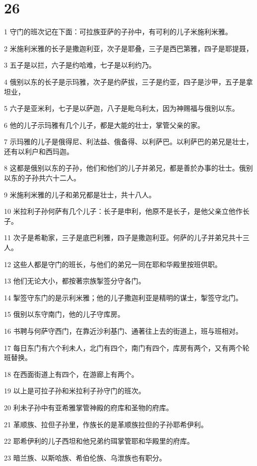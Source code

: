 \chapter{26}

\par 1 守门的班次记在下面：可拉族亚萨的子孙中，有可利的儿子米施利米雅。
\par 2 米施利米雅的长子是撒迦利亚，次子是耶叠，三子是西巴第雅，四子是耶提聂，
\par 3 五子是以拦，六子是约哈难，七子是以利约乃。
\par 4 俄别以东的长子是示玛雅，次子是约萨拔，三子是约亚，四子是沙甲，五子是拿坦业，
\par 5 六子是亚米利，七子是以萨迦，八子是毗乌利太，因为神赐福与俄别以东。
\par 6 他的儿子示玛雅有几个儿子，都是大能的壮士，掌管父亲的家。
\par 7 示玛雅的儿子是俄得尼、利法益、俄备得、以利萨巴。以利萨巴的弟兄是壮士，还有以利户和西玛迦。
\par 8 这都是俄别以东的子孙，他们和他们的儿子并弟兄，都是善於办事的壮士。俄别以东的子孙共六十二人。
\par 9 米施利米雅的儿子和弟兄都是壮士，共十八人。
\par 10 米拉利子孙何萨有几个儿子：长子是申利，他原不是长子，是他父亲立他作长子。
\par 11 次子是希勒家，三子是底巴利雅，四子是撒迦利亚。何萨的儿子并弟兄共十三人。
\par 12 这些人都是守门的班长，与他们的弟兄一同在耶和华殿里按班供职。
\par 13 他们无论大小，都按著宗族掣签分守各门。
\par 14 掣签守东门的是示利米雅；他的儿子撒迦利亚是精明的谋士，掣签守北门。
\par 15 俄别以东守南门，他的儿子守库房。
\par 16 书聘与何萨守西门，在靠近沙利基门、通著往上去的街道上，班与班相对。
\par 17 每日东门有六个利未人，北门有四个，南门有四个，库房有两个，又有两个轮班替换。
\par 18 在西面街道上有四个，在游廊上有两个。
\par 19 以上是可拉子孙和米拉利子孙守门的班次。
\par 20 利未子孙中有亚希雅掌管神殿的府库和圣物的府库。
\par 21 革顺族、拉但子孙里，作族长的是革顺族拉但的子孙耶希伊利。
\par 22 耶希伊利的儿子西坦和他兄弟约珥掌管耶和华殿里的府库。
\par 23 暗兰族、以斯哈族、希伯伦族、乌泄族也有职分。
